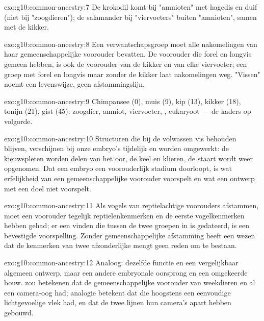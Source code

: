 \begin{solution}{exo:g10:common-ancestry:7}
De krokodil komt bij "amnioten" met hagedis en duif (niet bij
"zoogdieren"); de salamander bij "viervoeters" buiten "amnioten", samen
met de kikker.
\end{solution}

\begin{solution}{exo:g10:common-ancestry:8}
Een verwantschapsgroep moet alle nakomelingen van haar gemeenschappelijke
voorouder bevatten. De voorouder die forel en longvis gemeen hebben, is
ook de voorouder van de kikker en van elke viervoeter; een groep met
forel en longvis maar zonder de kikker laat nakomelingen weg. "Vissen"
noemt een levenswijze, geen afstammingslijn.
\end{solution}

\begin{solution}{exo:g10:common-ancestry:9}
Chimpansee (0), muis (9), kip (13), kikker (18), tonijn (21), gist (45):
zoogdier, amniot, viervoeter, , eukaryoot --- de kaders op
volgorde.
\end{solution}

\begin{solution}{exo:g10:common-ancestry:10}
Structuren die bij de volwassen vis behouden blijven, verschijnen bij
onze embryo's tijdelijk en worden omgewerkt: de kieuwspleten worden
delen van het oor, de keel en klieren, de staart wordt weer opgenomen.
Dat een embryo een voorouderlijk stadium doorloopt, is wat erfelijkheid
van een gemeenschappelijke voorouder voorspelt en wat een ontwerp met een
doel niet voorspelt.
\end{solution}

\begin{solution}{exo:g10:common-ancestry:11}
Als vogels van reptielachtige voorouders afstammen, moet een voorouder
tegelijk reptielenkenmerken en de eerste vogelkenmerken hebben gehad; er
een vinden die tussen de twee groepen in is gedateerd, is een bevestigde
voorspelling. Zonder gemeenschappelijke afstamming heeft een wezen dat de
kenmerken van twee afzonderlijke  mengt geen reden om te bestaan.
\end{solution}

\begin{solution}{exo:g10:common-ancestry:12}
Analoog: dezelfde functie en een vergelijkbaar algemeen ontwerp, maar een
andere embryonale oorsprong en een omgekeerde bouw.  zou
betekenen dat de gemeenschappelijke voorouder van weekdieren en
 al een camera-oog had; analogie betekent dat die hoogstens een
eenvoudige lichtgevoelige vlek had, en dat de twee lijnen hun camera's
apart hebben gebouwd.
\end{solution}

